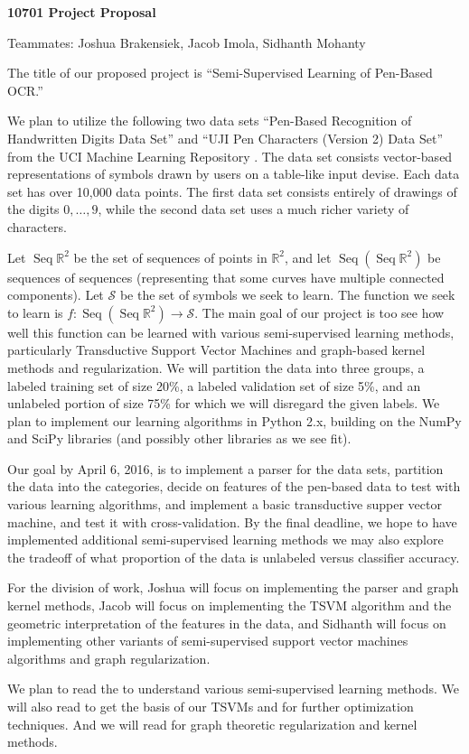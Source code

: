 \documentclass[11pt]{article}
\begin{document}
\newcommand{\Seq}{\operatorname{Seq}}
\begin{center}
  \textbf{10701 Project Proposal}
  
Teammates: Joshua Brakensiek, Jacob Imola, Sidhanth Mohanty
\end{center}

The title of our proposed project is ``Semi-Supervised Learning of Pen-Based OCR.''

We plan to utilize the following two data sets ``Pen-Based Recognition of Handwritten Digits Data Set'' \cite{Alpaydin:1998} and  ``UJI Pen Characters (Version 2) Data Set'' \cite{Llorens:2008} from the UCI Machine Learning Repository \cite{Lichman:2013}. The data set consists vector-based representations of symbols drawn by users on a table-like input devise. Each data set has over 10,000 data points. The first data set consists entirely of drawings of the digits $0, \hdots, 9$, while the second data set uses a much richer variety of characters.

Let $\Seq \mathbb R^2$ be the set of sequences of points in $\mathbb R^2$, and let $\Seq (\Seq \mathbb R^2)$ be sequences of sequences (representing that some curves have multiple connected components). Let $\mathcal S$ be the set of symbols we seek to learn. The function we seek to learn is $f : \Seq (\Seq \mathbb R^2) \to \mathcal S$. The main goal of our project is too see how well this function can be learned with various semi-supervised learning methods, particularly Transductive Support Vector Machines and graph-based kernel methods and regularization. We will partition the data into three groups, a labeled training set of size 20\%, a labeled validation set of size 5\%, and an unlabeled portion of size 75\% for which we will disregard the given labels. We plan to implement our learning algorithms in Python 2.x, building on the NumPy and SciPy libraries (and possibly other libraries as we see fit).

Our goal by April 6, 2016, is to implement a parser for the data sets, partition the data into the categories, decide on features of the pen-based data to test with various learning algorithms, and implement a basic transductive supper vector machine, and test it with cross-validation. By the final deadline, we hope to have implemented additional semi-supervised learning methods we may also explore the tradeoff of what proportion of the data is unlabeled versus classifier accuracy.

For the division of work, Joshua will focus on implementing the parser and graph kernel methods, Jacob will focus on implementing the TSVM
algorithm and the geometric interpretation of the features in the data, and Sidhanth will focus on implementing other variants of semi-supervised
support vector machines algorithms and graph regularization. 

We plan to read the \cite{Zhu:2005} to understand various semi-supervised learning methods. We will also read \cite{chapelle2006continuation}
to get the basis of our TSVMs and \cite{chapelle2008optimization} for further optimization techniques. And we will read \cite{smola2003kernels}
for graph theoretic regularization and kernel methods.



\end{document}
